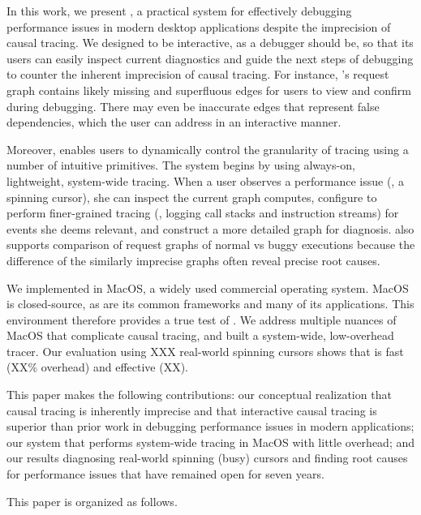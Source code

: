 In this work, we present \xxx, a practical system for effectively debugging
performance issues in modern desktop applications despite the imprecision of
causal tracing.  We designed \xxx to be interactive, as a debugger should be,
so that its users can easily inspect current diagnostics and guide the next
steps of debugging to counter the inherent imprecision of causal tracing. For
instance, \xxx's request graph contains likely missing and superfluous edges
for users to view and confirm during debugging. There may even be inaccurate
edges that represent false dependencies, which the user can address in an
interactive manner.

Moreover, \xxx enables users to dynamically control the granularity of
tracing using a number of intuitive primitives. The system begins by using
always-on, lightweight, system-wide tracing.  When a user observes a
performance issue (\eg, a spinning cursor), she can inspect the current
graph \xxx computes, configure \xxx to perform finer-grained tracing (\eg,
logging call stacks and instruction streams) for events she deems
relevant, and construct a more detailed graph for diagnosis.  \xxx also
supports comparison of request graphs of normal vs buggy executions
because the difference of the similarly imprecise graphs often reveal
precise root causes.  %

We implemented \xxx in MacOS, a widely used commercial operating system. MacOS
is closed-source, as are its common frameworks and many of its applications.
This environment therefore provides a true test of \xxx.  We address multiple
nuances of MacOS that complicate causal tracing, and built a system-wide,
low-overhead tracer.  Our evaluation using XXX real-world spinning cursors
shows that \xxx is fast (XX\% overhead) and effective (XX).

This paper makes the following contributions: our conceptual realization
that causal tracing is inherently imprecise and that interactive causal
tracing is superior than prior work in debugging performance issues in
modern applications; our system \xxx that performs system-wide tracing in
MacOS with little overhead; and our results diagnosing real-world spinning (busy)
cursors and finding root causes for performance issues that have remained open
for seven years.

This paper is organized as follows.


